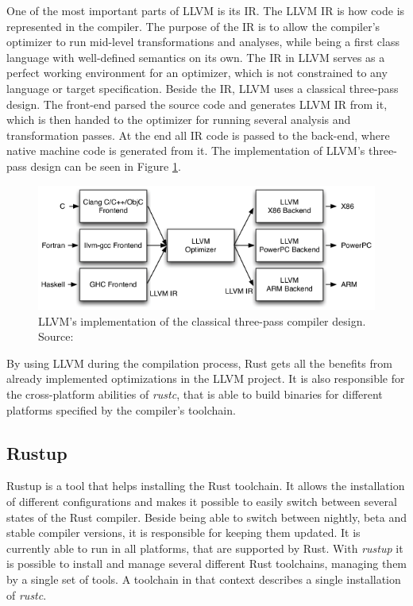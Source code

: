 One of the most important parts of \ac{LLVM} is its \ac{IR}. The \ac{LLVM} \ac{IR} is how code is represented in the compiler. The purpose of the \ac{IR} is to allow the compiler's optimizer to run mid-level transformations and analyses, while being a first class language with well-defined semantics on its own. The \ac{IR} in \ac{LLVM} serves as a perfect working environment for an optimizer, which is not constrained to any language or target specification. Beside the \ac{IR}, \ac{LLVM} uses a classical three-pass design. The front-end parsed the source code and generates \ac{LLVM} \ac{IR} from it, which is then handed to the optimizer for running several analysis and transformation passes. At the end all \ac{IR} code is passed to the back-end, where native machine code is generated from it. The implementation of \ac{LLVM}'s three-pass design can be seen in Figure \ref{fig:llvm_design}.

\begin{figure}[h!]
	\centering \includegraphics[width=\linewidth]{PICs/llvm_design.png}
	\caption{LLVM's implementation of the classical three-pass compiler design. Source: \cite{LLVM_ARCH}}
	\label{fig:llvm_design}
\end{figure}


\noindent
By using \ac{LLVM} during the compilation process, Rust gets all the benefits from already implemented optimizations in the \ac{LLVM} project. It is also responsible for the cross-platform abilities of \textit{rustc}, that is able to build binaries for different platforms specified by the compiler's toolchain. \cite{LLVM_ARCH}


\subsection{Rustup}

Rustup is a tool that helps installing the Rust toolchain. It allows the installation of different configurations and makes it possible to easily switch between several states of the Rust compiler. Beside being able to switch between nightly, beta and stable compiler versions, it is responsible for keeping them updated. It is currently able to run in all platforms, that are supported by Rust. With \textit{rustup} it is possible to install and manage several different Rust toolchains, managing them by a single set of tools. A toolchain in that context describes a single installation of \textit{rustc}.

